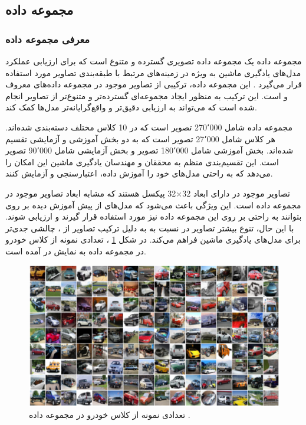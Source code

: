 \subsection{
	مجموعه داده
}


\vspace{3mm}
\subsubsection{
	معرفی مجموعه داده
}\vspace{-1mm}


مجموعه داده
یک مجموعه داده تصویری گسترده و متنوع است که برای ارزیابی عملکرد مدل‌های یادگیری ماشین به ویژه در زمینه‌های مرتبط با طبقه‌بندی تصاویر مورد استفاده قرار می‌گیرد
\cite{darlow2018cinic}.
این مجموعه داده، ترکیبی از تصاویر موجود در مجموعه‌ داده‌های معروف
و
است. این ترکیب به منظور ایجاد مجموعه‌ای گسترده‌تر و متنوع‌تر از تصاویر انجام شده است که می‌تواند به ارزیابی دقیق‌تر و واقع‌گرایانه‌تر مدل‌ها کمک کند.

مجموعه داده
شامل 270٬000 تصویر است که در 10 کلاس مختلف دسته‌بندی شده‌اند. هر کلاس شامل 27٬000 تصویر است که به دو بخش آموزشی و آزمایشی تقسیم شده‌اند. بخش آموزشی شامل 180٬000 تصویر و بخش آزمایشی شامل 90٬000 تصویر است. این تقسیم‌بندی منظم به محققان و مهندسان یادگیری ماشین این امکان را می‌دهد که به راحتی مدل‌های خود را آموزش داده، اعتبارسنجی و آزمایش کنند.

تصاویر موجود در
دارای ابعاد
32$\times$32
پیکسل هستند که مشابه ابعاد تصاویر موجود در مجموعه داده
است. این ویژگی باعث می‌شود که مدل‌های از پیش آموزش دیده بر روی
بتوانند به راحتی بر روی این مجموعه داده نیز مورد استفاده قرار گیرند و ارزیابی شوند. با این حال، تنوع بیشتر تصاویر در
نسبت به
به دلیل ترکیب تصاویر از
،
چالشی جدی‌تر برای مدل‌های یادگیری ماشین فراهم می‌کند.
در شکل
\ref{cinic10}%
، تعدادی نمونه از کلاس خودرو در مجموعه داده
\mbox{}
به نمایش در آمده است.


\begin{figure}[b!]
	\centering
	\includegraphics[scale=0.5]{images/chap5/cinic10.png}%
	\caption{%
		تعدادی نمونه از کلاس خودرو در مجموعه داده
		\cite{darlow2018cinic}.
	}
	\label{cinic10}
	\centering
\end{figure}



